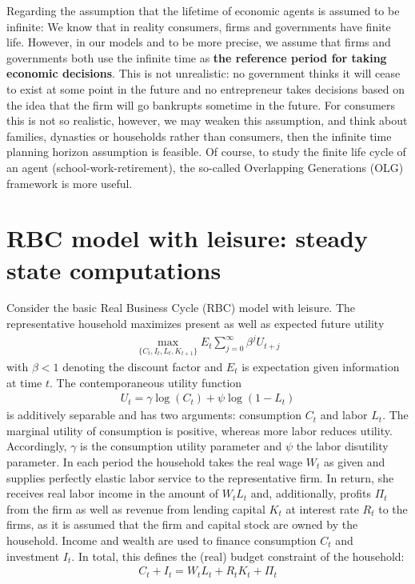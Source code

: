 \documentclass[a4paper]{scrartcl}
\begin{document}
\begin{enumerate}
\begin{solution}
	Regarding the assumption that the lifetime of economic agents is assumed to be infinite: We know that in reality consumers, firms and governments have finite life. However, in our models and to be more precise, we assume that firms and governments both use the infinite time as \textbf{the reference period for taking economic decisions}. This is not unrealistic: no government thinks it will cease to exist at some point in the future and no entrepreneur takes decisions based on the idea that the firm will go bankrupts sometime in the future. For consumers this is not so realistic, however, we may weaken this assumption, and think about families, dynasties or households rather than consumers, then the infinite time planning horizon assumption is feasible. Of course, to study the finite life cycle of an agent (school-work-retirement), the so-called Overlapping Generations (OLG) framework is more useful.
	\end{solution}
\end{enumerate}
\newpage


\section{RBC model with leisure: steady state computations}
	Consider the basic Real Business Cycle (RBC) model with leisure. The representative household maximizes present as well as expected future utility
	\begin{align*}
		\underset{\{C_{t},I_{t},L_t,K_{t+1}\}}{\max} E_t \sum_{j=0}^{\infty} \beta^{j} U_{t+j}
	\end{align*}
	with $\beta <1$ denoting the discount factor and $E_t$ is expectation given information at time $t$. The contemporaneous utility function 
	\begin{align*}
		U_t = \gamma \log(C_t) + \psi \log{(1-L_t)}
	\end{align*}
	is additively separable and has two arguments: consumption $C_t$ and labor $L_t$. The marginal utility of consumption is positive, whereas more labor reduces utility. Accordingly, $\gamma$ is the consumption utility parameter and $\psi$ the labor disutility parameter. In each period the household takes the real wage $W_t$ as given and supplies perfectly elastic labor service to the representative firm. In return, she receives real labor income in the amount of $W_t L_t$ and, additionally, profits $\Pi_t$ from the firm as well as revenue from lending capital $K_t$ at interest rate $R_t$ to the firms, as it is assumed that the firm and capital stock are owned by the household. Income and wealth are used to finance consumption $C_t$ and investment $I_t$. In total, this defines the (real) budget constraint of the household:
	\begin{align*}
	C_t + I_t = W_t L_t + R_t K_t + \Pi_t
	\end{align*}
	
\end{document}
